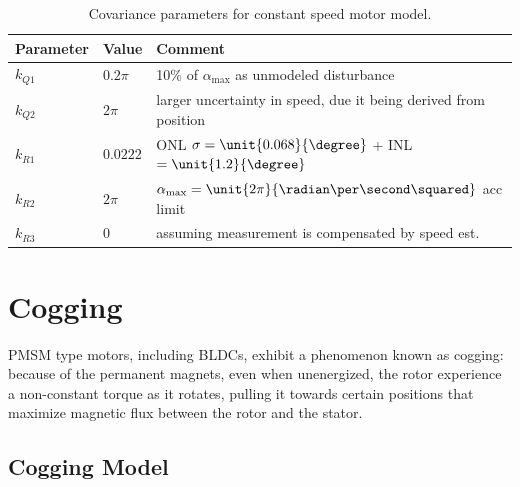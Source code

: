 \documentclass[12pt,a4paper,oneside,openany]{article}
\begin{document}
\begin{table}[htbp]
\caption{Covariance parameters for constant speed motor model.}
\begin{center}
\begin{tabular}{llp{}} \toprule
 Parameter & Value & Comment \\
\midrule
$k_{Q1}$ & $0.2\pi$ & \unit{10}{\%} of $\alpha_{\textrm{max}}$ as unmodeled disturbance\\
$k_{Q2}$ & $2\pi$ & larger uncertainty in speed, due it being derived from position\\
$k_{R1}$ & $0.0222$  & ONL $\sigma = \unit{0.068}{\degree}$ + INL $ = \unit{1.2}{\degree}$\\
$k_{R2}$ & $2\pi$ & $\alpha_{\textrm{max}} = \unit{2\pi}{\radian\per\second\squared}$ acc limit \\
$k_{R3}$ & $0$ & assuming measurement is compensated by speed est. \\
\bottomrule
\end{tabular}
\end{center}
\label{tab:cov-params-const-speed}
\end{table}%


\section{Cogging}

PMSM type motors, including BLDCs, exhibit a phenomenon known as cogging: because of the permanent magnets, even when unenergized, the rotor experience a non-constant torque as it rotates, pulling it towards certain positions that maximize magnetic flux between the rotor and the stator.

\subsection{Cogging Model}
\end{document}

